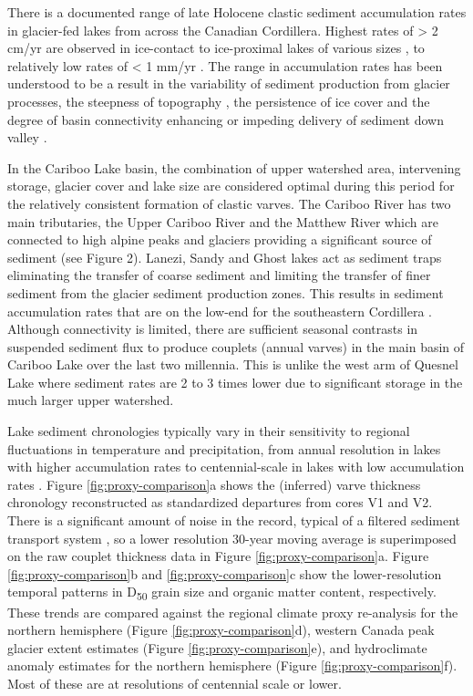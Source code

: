 \documentclass[Royal,times,doublespace,sageh]{sagej}
\begin{document}
There is a documented range of late Holocene clastic sediment
accumulation rates in glacier-fed lakes from across the Canadian
Cordillera. Highest rates of \textgreater{} 2 cm/yr are observed in
ice-contact to ice-proximal lakes of various sizes
\citep{Desloges1994d, Crookshanks2008}, to relatively low rates of
\textless{} 1 mm/yr \citep{Gilbert2012}. The range in accumulation rates
has been understood to be a result in the variability of sediment
production from glacier processes, the steepness of topography
\citep{Ballantyne2002}, the persistence of ice cover and the degree of
basin connectivity enhancing or impeding delivery of sediment down
valley \citep{Wohl2019}.

In the Cariboo Lake basin, the combination of upper watershed area,
intervening storage, glacier cover and lake size are considered optimal
during this period for the relatively consistent formation of clastic
varves. The Cariboo River has two main tributaries, the Upper Cariboo
River and the Matthew River which are connected to high alpine peaks and
glaciers providing a significant source of sediment (see Figure 2).
Lanezi, Sandy and Ghost lakes act as sediment traps eliminating the
transfer of coarse sediment and limiting the transfer of finer sediment
from the glacier sediment production zones. This results in sediment
accumulation rates that are on the low-end for the southeastern
Cordillera \citep{Hodder2006b}. Although connectivity is limited, there
are sufficient seasonal contrasts in suspended sediment flux to produce
couplets (annual varves) in the main basin of Cariboo Lake over the last
two millennia. This is unlike the west arm of Quesnel Lake where
sediment rates are 2 to 3 times lower due to significant storage in the
much larger upper watershed.

Lake sediment chronologies typically vary in their sensitivity to
regional fluctuations in temperature and precipitation, from annual
resolution in lakes with higher accumulation rates
\citep[e.g.][]{Menounos2008c} to centennial-scale in lakes with low
accumulation rates \citep[e.g.][]{Desloges1999}. Figure
\ref{fig:proxy-comparison}a shows the (inferred) varve thickness
chronology reconstructed as standardized departures from cores V1 and
V2. There is a significant amount of noise in the record, typical of a
filtered sediment transport system \citep[e.g.][]{Jerolmack2010}, so a
lower resolution 30-year moving average is superimposed on the raw
couplet thickness data in Figure \ref{fig:proxy-comparison}a. Figure
\ref{fig:proxy-comparison}b and \ref{fig:proxy-comparison}c show the
lower-resolution temporal patterns in D\textsubscript{50} grain size and
organic matter content, respectively. These trends are compared against
the \citet{Moberg2005} regional climate proxy re-analysis for the
northern hemisphere (Figure \ref{fig:proxy-comparison}d),
\citet{Solomina2016} western Canada peak glacier extent estimates
(Figure \ref{fig:proxy-comparison}e), and \citet{Ljungqvist2016}
hydroclimate anomaly estimates for the northern hemisphere (Figure
\ref{fig:proxy-comparison}f). Most of these are at resolutions of
centennial scale or lower.
\end{document}
